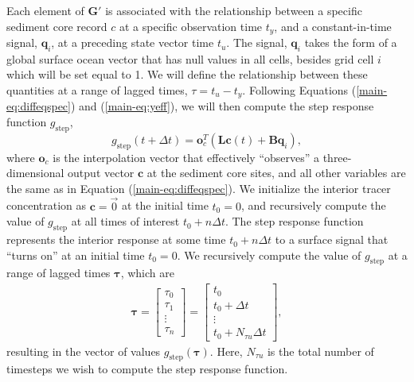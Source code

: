 \documentclass[draft]{agujournal2019}
\begin{document}
Each element of $\mathbf{G}'$ is associated with the relationship between a specific sediment core record $c$ at a specific observation time $t_{y}$, and a constant-in-time signal, $\mathbf{q}_{i}$, at a preceding state vector time $t_{u}$. The signal, $\mathbf{q}_{i}$ takes the form of a global surface ocean vector that has null values in all cells, besides grid cell $i$ which will be set equal to 1. We will define the relationship between these quantities at a range of lagged times, $\tau = t_{u} - t_{y}$. Following Equations (\ref{main-eq:diffeqspec}) and (\ref{main-eq:yeff}), we will then compute the step response function $g_{\mathrm{step}}$, 
\begin{equation}
\label{eq:mtau}
g_{\mathrm{step}}(t+\Delta t) = \mathbf{o}_{c}^{T}\left(\mathbf{Lc}(t) + \mathbf{Bq}_{i}\right), 
\end{equation}
where $\mathbf{o}_{c}$ is the interpolation vector that effectively ``observes'' a three-dimensional output vector $\mathbf{c}$ at the sediment core sites, and all other variables are the same as in Equation (\ref{main-eq:diffeqspec}). We initialize the interior tracer concentration as $\mathbf{c} = \vec{0}$ at the initial time $t_{0} = 0$, and recursively compute the value of $g_{\mathrm{step}}$ at all times of interest $t_{0 }+n \Delta t $. The step response function represents the interior response at some time $t_{0}+n\Delta t$ to a surface signal that ``turns on'' at an initial time $t_0 = 0$. We recursively compute the value of $g_{\mathrm{step}}$ at a range of lagged times $\bm{\tau}$, which are 
\begin{align}
  \label{eq:tau}
  \bm{\tau} = 
\begin{bmatrix}
\tau_{0}\\
\tau_{1}\\
\vdots \\
\tau_{n}
\end{bmatrix}
    =
 \begin{bmatrix}
 t_{0} \\
t_{0}+ \Delta t \\
   \vdots\\
t_{0} + N_{\tau u} \Delta t
 \end{bmatrix},
\end{align}
resulting in the vector of values $g_{\mathrm{step}}(\bm{\tau})$. Here, $N_{\tau u}$ is the total number of timesteps we wish to compute the step response function.
\end{document}
